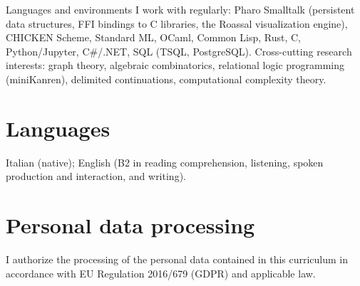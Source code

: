 \documentclass[11pt,a4paper]{article}
\begin{document}
Languages and environments I work with regularly: Pharo Smalltalk (persistent data structures, FFI bindings to C libraries, the Roassal visualization engine), CHICKEN Scheme, Standard ML, OCaml, Common Lisp, Rust, C, Python/Jupyter, C\#/.NET, SQL (TSQL, PostgreSQL). Cross-cutting research interests: graph theory, algebraic combinatorics, relational logic programming (miniKanren), delimited continuations, computational complexity theory.

\section*{Languages}

Italian (native); English (B2 in reading comprehension, listening, spoken production and interaction, and writing).

\section*{Personal data processing}

I authorize the processing of the personal data contained in this curriculum in accordance with EU Regulation 2016/679 (GDPR) and applicable law.
\end{document}
